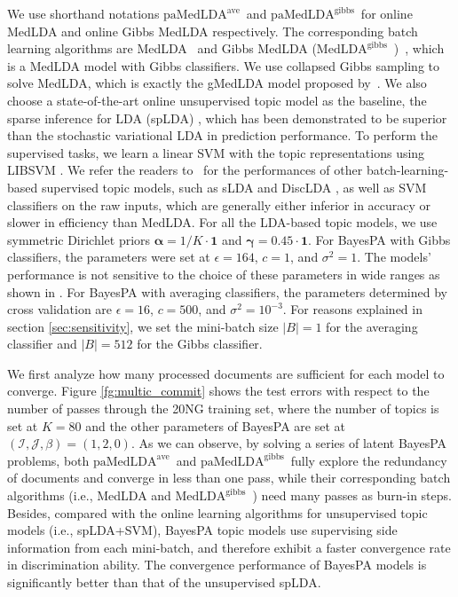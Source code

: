 \documentclass[twoside,11pt]{article}
\newcommand\paMedLDAave{$\text{paMedLDA}^{\text{ave}}$~}
\newcommand\paMedLDAgibbs{$\text{paMedLDA}^{\text{gibbs}}$~}
\newcommand\MedLDAgibbs{$\text{MedLDA}^{\text{gibbs}}$~}
\begin{document}
We use shorthand notations \paMedLDAave and \paMedLDAgibbs for online MedLDA and online Gibbs MedLDA respectively. The corresponding batch learning algorithms are MedLDA~\citep{zhu2012medlda} and Gibbs MedLDA (\MedLDAgibbs)~\citep{zhugibbs2013}, which is a MedLDA model with Gibbs classifiers. We use collapsed Gibbs sampling to solve MedLDA, which is exactly the gMedLDA model proposed by~\cite{jiang2012monte}. We also choose a state-of-the-art online unsupervised topic model as the baseline, the sparse inference for LDA (spLDA) \citep{mimno2012sparse}, which has been demonstrated to be superior than the stochastic variational LDA \citep{hoffman2013stochastic} in prediction performance. To perform the supervised tasks, we learn a linear SVM with the topic representations using LIBSVM \citep{chang2011libsvm}. We refer the readers to~\citep{zhu2012medlda} for the performances of other batch-learning-based supervised topic models, such as sLDA \citep{blei2010supervised} and DiscLDA \citep{lacoste2008disclda}, as well as SVM classifiers on the raw inputs, which are generally either inferior in accuracy or slower in efficiency than MedLDA. For all the LDA-based topic models, we use symmetric Dirichlet priors $\bm{\alpha} = 1/K \cdot \bm{1}$ and $\bm{\gamma} = 0.45 \cdot \bm{1}$. For BayesPA with Gibbs classifiers, the parameters were set at $\epsilon = 164$, $c = 1$, and $\sigma^2 = 1$. The models' performance is not sensitive to the choice of these parameters in wide ranges as shown in \cite{zhugibbs2013}. For BayesPA with averaging classifiers, the parameters determined by cross validation are $\epsilon = 16$, $c = 500$, and $\sigma^2 = 10^{-3}$. For reasons explained in section \ref{sec:sensitivity}, we set the mini-batch size $|B| = 1$ for the averaging classifier and $|B| = 512$ for the Gibbs classifier.

We first analyze how many processed documents are sufficient for each model to converge. Figure \ref{fg:multic_commit} shows the test errors with respect to the number of passes through the 20NG training set, where the number of topics is set at $K = 80$ and the other parameters of BayesPA are set at $(\mathcal{I}, \mathcal{J}, \beta) = (1, 2, 0)$. As we can observe, by solving a series of latent BayesPA problems, both \paMedLDAave and \paMedLDAgibbs fully explore the redundancy of documents and converge in  less than one pass, while their corresponding batch algorithms (i.e., MedLDA and \MedLDAgibbs) need many passes as burn-in steps. Besides, compared with the online learning algorithms for unsupervised topic models (i.e., spLDA+SVM), BayesPA topic models use supervising side information from each mini-batch, and therefore exhibit a faster convergence rate in discrimination ability. The convergence performance of BayesPA models is significantly better than that of the unsupervised spLDA.
\end{document}
